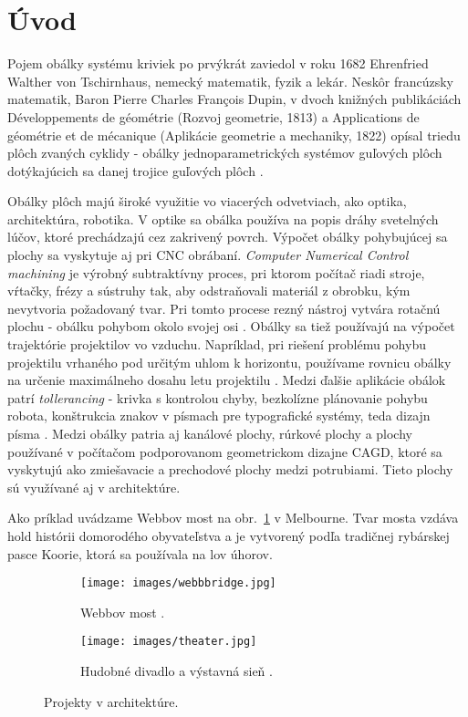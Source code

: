 \chapter*{Úvod} %
Pojem obálky systému kriviek po prvýkrát zaviedol v roku 1682 Ehrenfried Walther von Tschirnhaus, nemecký matematik, fyzik a lekár. Neskôr francúzsky matematik, Baron Pierre Charles François Dupin, v dvoch knižných publikáciách Développements de géométrie (Rozvoj geometrie, 1813) a Applications de géométrie et de mécanique (Aplikácie geometrie a mechaniky, 1822) opísal triedu plôch zvaných cyklidy - obálky jednoparametrických systémov guľových plôch dotýkajúcich sa danej trojice guľových plôch \cite{Ciz2017}.

Obálky plôch majú široké využitie vo viacerých odvetviach, ako optika, architektúra, robotika. V optike sa obálka používa na popis dráhy svetelných lúčov, ktoré prechádzajú cez zakrivený povrch. Výpočet obálky pohybujúcej sa plochy sa vyskytuje aj pri CNC obrábaní. \textit{Computer Numerical Control machining} je výrobný subtraktívny proces, pri ktorom počítač riadi stroje, vŕtačky, frézy a sústruhy tak, aby odstraňovali materiál z obrobku, kým nevytvoria požadovaný tvar. Pri tomto procese rezný nástroj vytvára rotačnú plochu - obálku pohybom okolo svojej osi \cite{Skop20}. Obálky sa tiež používajú na výpočet trajektórie projektilov vo vzduchu. Napríklad, pri riešení problému pohybu projektilu vrhaného pod určitým uhlom k horizontu, používame rovnicu obálky na určenie maximálneho dosahu letu projektilu \cite{Chud09}. Medzi ďalšie aplikácie obálok patrí \textit{tollerancing} - krivka s kontrolou chyby, bezkolízne plánovanie pohybu robota, konštrukcia znakov v písmach pre typografické systémy, teda dizajn písma \cite{Pott09}. Medzi obálky patria aj kanálové plochy, rúrkové plochy a plochy používané v počítačom podporovanom geometrickom dizajne CAGD, ktoré sa vyskytujú ako zmiešavacie a prechodové plochy medzi potrubiami. Tieto plochy sú využívané aj v architektúre.

Ako príklad uvádzame Webbov most na obr.~\ref{fig:webb_bridge} v Melbourne. Tvar mosta vzdáva hold histórii domorodého obyvateľstva a je vytvorený podľa tradičnej rybárskej pasce Koorie, ktorá sa používala na lov úhorov.

\begin{figure}[h]
    \centering
    \begin{subfigure}[b]{0.6\textwidth}
        \centering
        \texttt{[image: images/webbbridge.jpg]}
        \caption[Webbov most.]{Webbov most \cite{WebbBridge}.}
        \label{fig:webb_bridge}
    \end{subfigure}
    \hfill
    \begin{subfigure}[b]{0.6\textwidth}
        \centering
        \texttt{[image: images/theater.jpg]}
        \caption[Hudobné divadlo a výstavná sieň.]{Hudobné divadlo a výstavná sieň \cite{MusicTheater}.}
        \label{fig:theater}
    \end{subfigure}
    \caption{Projekty v architektúre.}
    \label{fig:projects}
\end{figure}


